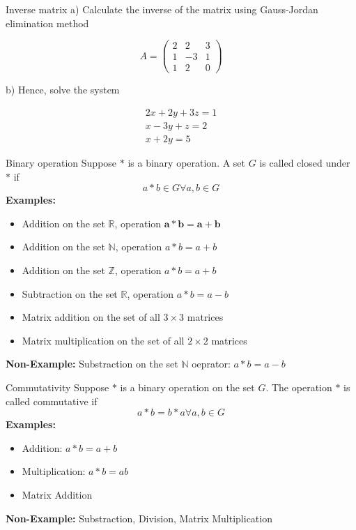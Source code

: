 \documentclass[11pt]{beamer}
\theoremstyle{plain}
\begin{document}
\begin{frame}{Inverse matrix}
a) Calculate the inverse of the matrix using Gauss-Jordan elimination method

$$
A=\left(\begin{array}{ccc}
2 & 2 & 3 \\
1 & -3 & 1 \\
1 & 2 & 0
\end{array}\right)
$$

b) Hence, solve the system

$$
\begin{array}{r}
2 x+2 y+3 z=1 \\
x-3 y+z=2 \\
x+2 y=5
\end{array}
$$
    
\end{frame}

\begin{frame}{Binary operation}
    Suppose $*$ is a binary operation. A set $G$ is called closed under $*$ if $$a*b\in G\forall a,b\in G$$
    \textbf{Examples:}
    \begin{itemize}
    \item Addition on the set $\mathbb{R}$, operation $\boldsymbol{a} * \boldsymbol{b}=\boldsymbol{a}+\boldsymbol{b}$
    \item Addition on the set $\mathbb{N}$, operation $a * b=a+b$
    \item Addition on the set $\mathbb{Z}$, operation $a * b=a+b$
    \item Subtraction on the set $\mathbb{R}$, operation $a * b=a-b$
    \item Matrix addition on the set of all $3 \times 3$ matrices
    \item Matrix multiplication on the set of all $2 \times 2$ matrices
    \end{itemize}
    \textbf{Non-Example:}
    Substraction on the set $\mathbb N$ oeprator: $a*b=a-b$
\end{frame}

\begin{frame}{Commutativity}
    Suppose $*$ is a binary operation on the set $G$. The operation $*$ is called commutative if $$a*b=b*a \forall a,b\in G$$
    \textbf{Examples:}
    \begin{itemize}
    \item Addition: $a*b=a+b$
    \item Multiplication: $a*b=ab$
    \item Matrix Addition
    \end{itemize}
    \textbf{Non-Example:}
    Substraction, Division, Matrix Multiplication
\end{frame}
\end{document}
